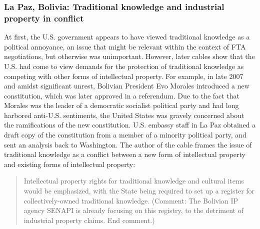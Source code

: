 \documentclass[12pt]{article}
\begin{document}
\subsubsection{La Paz, Bolivia: Traditional knowledge and industrial property in conflict}
At first, the U.S. government appears to have viewed traditional knowledge as a political annoyance, 
an issue that might be relevant within the context of FTA negotiations, but otherwise was 
unimportant. However, later cables show that the U.S. had come to view demands for the protection 
of traditional knowledge as competing with other forms of intellectual property. For example, 
in late 2007 and amidst significant unrest, Bolivian President Evo Morales introduced a new 
constitution, which was later approved in a referendum. Due to the fact that Morales was the 
leader of a democratic socialist political party and had 
long harbored anti-U.S. sentiments, the United States was gravely concerned about the ramifications 
of the new constitution. U.S. embassy staff in La Paz obtained a draft copy of the constitution from a 
member of a minority political party, and sent an analysis back to Washington. The author of the cable 
frames the issue of traditional knowledge as a conflict between a new form of intellectual property 
and existing forms of intellectual property:
\begin{quote}Intellectual property
rights for traditional knowledge and cultural items would be emphasized, with the State being required 
to set up a register for collectively-owned traditional knowledge. (Comment: The Bolivian IP agency 
SENAPI is already focusing on this registry, to the detriment of industrial property claims. 
End comment.) \citep{u.s._department_of_state2007bolivia:}
\end{quote}

\end{document}
